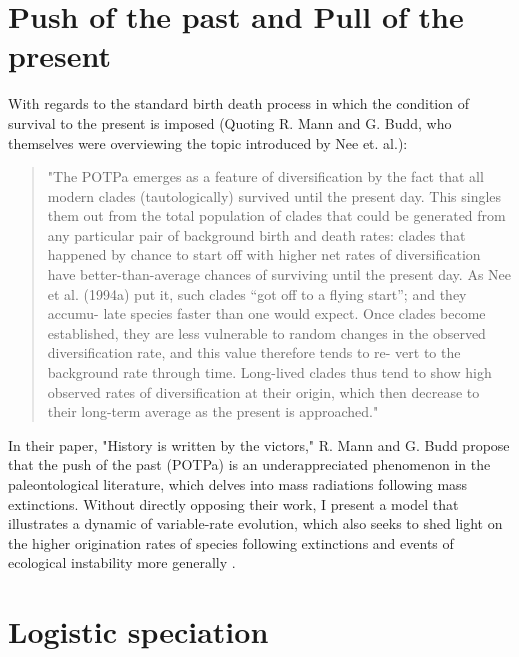 \section{Push of the past and Pull of the present}


With regards to the standard birth death process in which the condition of survival to the present is imposed (Quoting R.  Mann and G. Budd, who themselves were overviewing the topic introduced by Nee et.  al.):


\begin{quotation}
\noindent
"The POTPa emerges as a feature of diversification by the fact
that all modern clades (tautologically) survived until the present
day. This singles them out from the total population of clades
that could be generated from any particular pair of background
birth and death rates: clades that happened by chance to start off
with higher net rates of diversification have better-than-average
chances of surviving until the present day. As Nee et al. (1994a)
put it, such clades “got off to a flying start”; and they accumu-
late species faster than one would expect. Once clades become
established, they are less vulnerable to random changes in the
observed diversification rate, and this value therefore tends to re-
vert to the background rate through time. Long-lived clades thus
tend to show high observed rates of diversification at their origin,
which then decrease to their long-term average as the present is
approached."
\end{quotation}

\noindent
In their paper, "History is written by the victors," R. Mann and G. Budd propose that the push of the past (POTPa) is an underappreciated phenomenon in the paleontological literature, which delves into mass radiations following mass extinctions.
Without directly opposing their work, I present a model that illustrates a dynamic of variable-rate evolution, which also seeks to shed light on the higher origination rates of species following extinctions and events of ecological instability more generally \cite{bak1991self} \cite{fisher1929genetical}\cite{budd2018history}.







\section{Logistic speciation}








